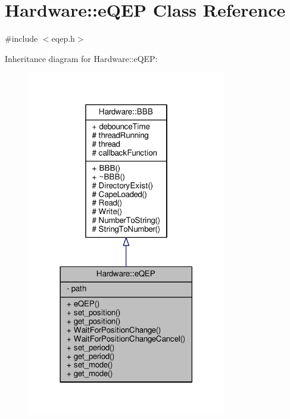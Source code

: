 \hypertarget{class_hardware_1_1e_q_e_p}{}\section{Hardware\+:\+:e\+Q\+E\+P Class Reference}
\label{class_hardware_1_1e_q_e_p}


{\ttfamily \#include $<$eqep.\+h$>$}



Inheritance diagram for Hardware\+:\+:e\+Q\+E\+P\+:\nopagebreak
\begin{figure}[H]
\begin{center}
\leavevmode
\includegraphics[width=246pt]{class_hardware_1_1e_q_e_p__inherit__graph}
\end{center}
\end{figure}


